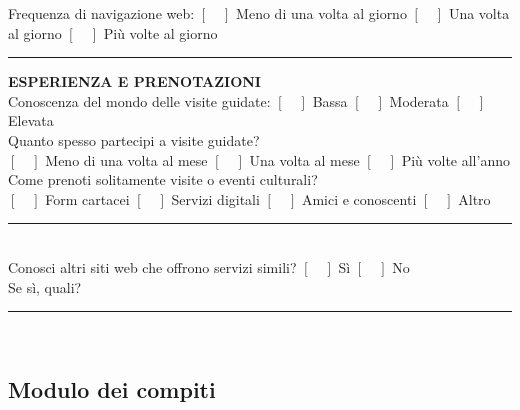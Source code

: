{\begin{minipage}{0.96\linewidth}
Frequenza di navigazione web: \quad $[\quad]$ Meno di una volta al giorno \quad $[\quad]$ Una volta al giorno \quad $[\quad]$ Più volte al giorno \\[0.2cm]
\hrule \vspace{0.2cm}
\textbf{ESPERIENZA E PRENOTAZIONI}\\[0.15cm]
Conoscenza del mondo delle visite guidate: \quad $[\quad]$ Bassa \quad $[\quad]$ Moderata \quad $[\quad]$ Elevata \\[0.1cm]
Quanto spesso partecipi a visite guidate? \\[0.1cm]
$[\quad]$ Meno di una volta al mese \quad $[\quad]$ Una volta al mese \quad $[\quad]$ Più volte all'anno \\[0.1cm]
Come prenoti solitamente visite o eventi culturali? \\[0.1cm]
$[\quad]$ Form cartacei \quad $[\quad]$ Servizi digitali \quad $[\quad]$ Amici e conoscenti \quad $[\quad]$ Altro \rule{3cm}{0.4pt} \\[0.1cm]
Conosci altri siti web che offrono servizi simili? \quad $[\quad]$ Sì \quad $[\quad]$ No \\[0.1cm]
Se sì, quali? \rule{6cm}{0.4pt} \\[0.2cm]
\end{minipage}}

\vspace{0.5cm}

\subsection{Modulo dei compiti}

\vspace{0.5cm}

